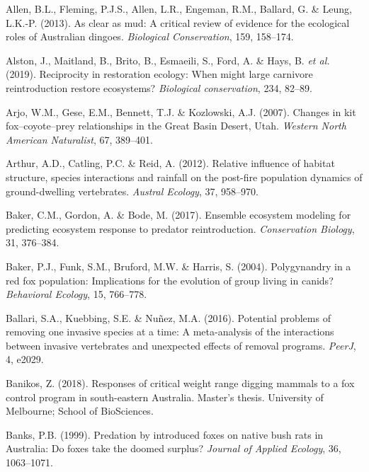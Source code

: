 \documentclass[11pt,a4paper,titlepage,twoside,openright]{style/unimelbthesis}
\begin{document}
\begin{mainmatter}
\leavevmode\hypertarget{ref-allen2013clear}{}%
Allen, B.L., Fleming, P.J.S., Allen, L.R., Engeman, R.M., Ballard, G. \& Leung, L.K.-P. (2013). As clear as mud: A critical review of evidence for the ecological roles of Australian dingoes. \emph{Biological Conservation}, 159, 158--174.

\leavevmode\hypertarget{ref-alston2019reciprocity}{}%
Alston, J., Maitland, B., Brito, B., Esmaeili, S., Ford, A. \& Hays, B. \emph{et al.} (2019). Reciprocity in restoration ecology: When might large carnivore reintroduction restore ecosystems? \emph{Biological conservation}, 234, 82--89.

\leavevmode\hypertarget{ref-arjo2007changes}{}%
Arjo, W.M., Gese, E.M., Bennett, T.J. \& Kozlowski, A.J. (2007). Changes in kit fox--coyote--prey relationships in the Great Basin Desert, Utah. \emph{Western North American Naturalist}, 67, 389--401.

\leavevmode\hypertarget{ref-arthur2012relative}{}%
Arthur, A.D., Catling, P.C. \& Reid, A. (2012). Relative influence of habitat structure, species interactions and rainfall on the post-fire population dynamics of ground-dwelling vertebrates. \emph{Austral Ecology}, 37, 958--970.

\leavevmode\hypertarget{ref-baker2017ensemble}{}%
Baker, C.M., Gordon, A. \& Bode, M. (2017). Ensemble ecosystem modeling for predicting ecosystem response to predator reintroduction. \emph{Conservation Biology}, 31, 376--384.

\leavevmode\hypertarget{ref-baker2004polygynandry}{}%
Baker, P.J., Funk, S.M., Bruford, M.W. \& Harris, S. (2004). Polygynandry in a red fox population: Implications for the evolution of group living in canids? \emph{Behavioral Ecology}, 15, 766--778.

\leavevmode\hypertarget{ref-ballari2016potential}{}%
Ballari, S.A., Kuebbing, S.E. \& Nuñez, M.A. (2016). Potential problems of removing one invasive species at a time: A meta-analysis of the interactions between invasive vertebrates and unexpected effects of removal programs. \emph{PeerJ}, 4, e2029.

\leavevmode\hypertarget{ref-banikos2018responses}{}%
Banikos, Z. (2018). Responses of critical weight range digging mammals to a fox control program in south-eastern Australia. Master's thesis. University of Melbourne; School of BioSciences.

\leavevmode\hypertarget{ref-banks1999predation}{}%
Banks, P.B. (1999). Predation by introduced foxes on native bush rats in Australia: Do foxes take the doomed surplus? \emph{Journal of Applied Ecology}, 36, 1063--1071.


\end{mainmatter}
\end{document}
